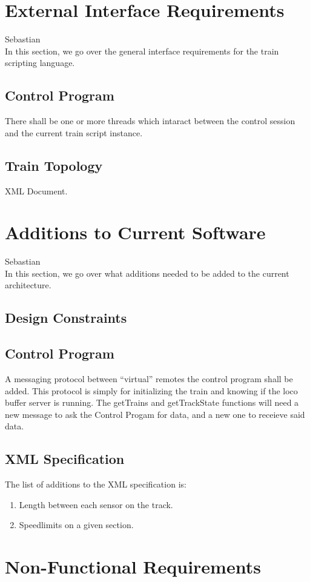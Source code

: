 \documentclass[a4paper,11pt,notitlepage]{article}
\def\CS{Control Progam\xspace} \def\LC{Local Copy of Train State\xspace} \def\TN{Track Node\xspace}
\begin{document}
\newpage
\section{External Interface Requirements}
Sebastian\\
    In this section, we go over the general interface requirements for the train scripting language.
\subsection{Control Program}
    There shall be one or more threads which intaract between the control session and the current train script instance.
\subsection{Train Topology}
	XML Document.

\newpage
\section{Additions to Current Software}
Sebastian \\
    In this section, we go over what additions needed to be added to the
    current architecture.
\subsection{Design Constraints}
\subsection{Control Program}
    A messaging protocol between ``virtual'' remotes the control program shall be added.  This protocol is simply for initializing the train and knowing if the loco buffer server is running. The getTrains and getTrackState functions will need a new message to ask the \CS for data, and a new one to receieve said data.
\subsection{XML Specification}
    The list of additions to the XML specification is:
\begin{enumerate}
    \item Length between each sensor on the track.
    \item Speedlimits on a given section.
\end{enumerate}

\newpage
\section{Non-Functional Requirements}
\end{document}

